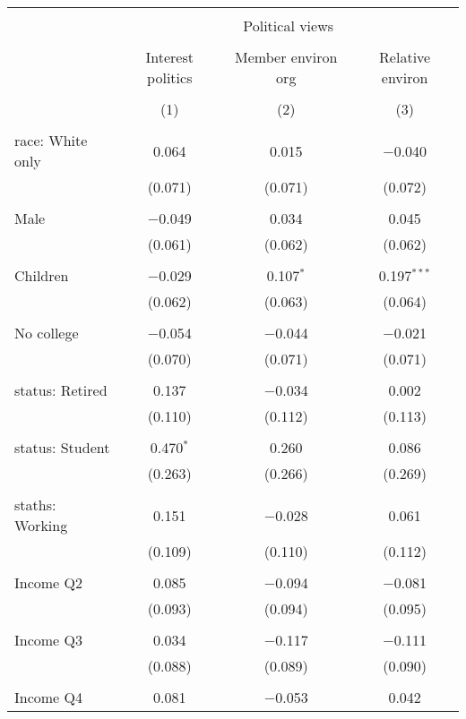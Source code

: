
\begin{tabular}{@{\extracolsep{5pt}}lccc} 
\\[-1.8ex]\hline 
\hline \\[-1.8ex] 
 & \multicolumn{3}{c}{Political views} \\ 
\cline{2-4} 
\\[-1.8ex] & Interest politics & Member environ org & Relative environ \\ 
\\[-1.8ex] & (1) & (2) & (3)\\ 
\hline \\[-1.8ex] 
 race: White only & 0.064 & 0.015 & $-$0.040 \\ 
  & (0.071) & (0.071) & (0.072) \\ 
  & & & \\ 
 Male & $-$0.049 & 0.034 & 0.045 \\ 
  & (0.061) & (0.062) & (0.062) \\ 
  & & & \\ 
 Children & $-$0.029 & 0.107$^{*}$ & 0.197$^{***}$ \\ 
  & (0.062) & (0.063) & (0.064) \\ 
  & & & \\ 
 No college & $-$0.054 & $-$0.044 & $-$0.021 \\ 
  & (0.070) & (0.071) & (0.071) \\ 
  & & & \\ 
 status: Retired & 0.137 & $-$0.034 & 0.002 \\ 
  & (0.110) & (0.112) & (0.113) \\ 
  & & & \\ 
 status: Student & 0.470$^{*}$ & 0.260 & 0.086 \\ 
  & (0.263) & (0.266) & (0.269) \\ 
  & & & \\ 
 staths: Working & 0.151 & $-$0.028 & 0.061 \\ 
  & (0.109) & (0.110) & (0.112) \\ 
  & & & \\ 
 Income Q2 & 0.085 & $-$0.094 & $-$0.081 \\ 
  & (0.093) & (0.094) & (0.095) \\ 
  & & & \\ 
 Income Q3 & 0.034 & $-$0.117 & $-$0.111 \\ 
  & (0.088) & (0.089) & (0.090) \\ 
  & & & \\ 
 Income Q4 & 0.081 & $-$0.053 & 0.042 \\ 

\end{tabular}

